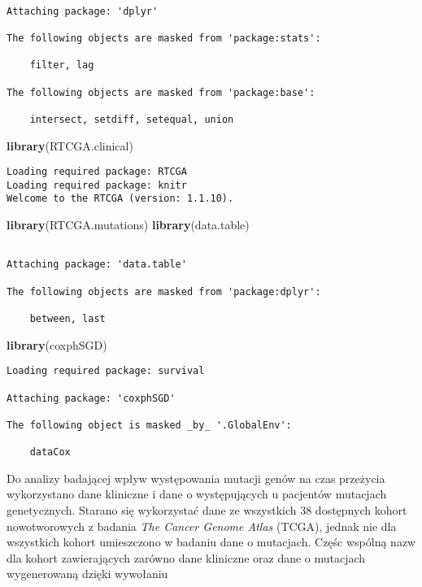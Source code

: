\documentclass[]{article}
\newenvironment{Shaded}{\begin{snugshade}}{\end{snugshade}}
\newcommand{\KeywordTok}[1]{\textcolor[rgb]{0.13,0.29,0.53}{\textbf{{#1}}}}
\newcommand{\NormalTok}[1]{{#1}}
\begin{document}
\begin{verbatim}

Attaching package: 'dplyr'

The following objects are masked from 'package:stats':

    filter, lag

The following objects are masked from 'package:base':

    intersect, setdiff, setequal, union
\end{verbatim}

\begin{Shaded}
\begin{Highlighting}[]
\KeywordTok{library}\NormalTok{(RTCGA.clinical)}
\end{Highlighting}
\end{Shaded}

\begin{verbatim}
Loading required package: RTCGA
Loading required package: knitr
Welcome to the RTCGA (version: 1.1.10).
\end{verbatim}

\begin{Shaded}
\begin{Highlighting}[]
\KeywordTok{library}\NormalTok{(RTCGA.mutations)}
\KeywordTok{library}\NormalTok{(data.table)}
\end{Highlighting}
\end{Shaded}

\begin{verbatim}

Attaching package: 'data.table'

The following objects are masked from 'package:dplyr':

    between, last
\end{verbatim}

\begin{Shaded}
\begin{Highlighting}[]
\KeywordTok{library}\NormalTok{(coxphSGD)}
\end{Highlighting}
\end{Shaded}

\begin{verbatim}
Loading required package: survival

Attaching package: 'coxphSGD'

The following object is masked _by_ '.GlobalEnv':

    dataCox
\end{verbatim}

Do analizy badającej wpływ występowania mutacji genów na czas przeżycia
wykorzystano dane kliniczne i dane o występujących u pacjentów mutacjach
genetycznych. Starano się wykorzystać dane ze wszystkich 38 dostępnych
kohort nowotworowych z badania \textit{The Cancer Genome Atlas} (TCGA),
jednak nie dla wszystkich kohort umieszczono w badaniu dane o mutacjach.
Częśc wspólną nazw dla kohort zawierających zarówno dane kliniczne oraz
dane o mutacjach wygenerowaną dzięki wywołaniu
\end{document}
